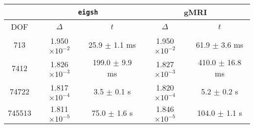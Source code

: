 \centering
\renewcommand{\arraystretch}{1.1}
\begin{tabular}{@{}c|cc|cc@{}}
    \toprule
     & \multicolumn{2}{c|}{\texttt{eigsh}} & \multicolumn{2}{c}{\acrshort{gMRI}} \\
    \midrule
    DOF & $\Delta$ & $t$ & $\Delta$ & $t$ \\
    \midrule
    713 & 1.950 $\times 10^{-2}$ & 25.9 $\pm$ 1.1 ms & 1.950 $\times 10^{-2}$ & 61.9 $\pm$ 3.6 ms \\
    7412 & 1.826 $\times 10^{-3}$ & 199.0 $\pm$ 9.9 ms & 1.827 $\times 10^{-3}$ & 410.0 $\pm$ 16.8 ms \\
    74722 & 1.817 $\times 10^{-4}$ & 3.5 $\pm$ 0.1 s & 1.820 $\times 10^{-4}$ & 5.2 $\pm$ 0.2 s \\
    745513 & 1.811 $\times 10^{-5}$ & 75.0 $\pm$ 1.6 s & 1.846 $\times 10^{-5}$ & 104.0 $\pm$ 1.1 s \\
    \bottomrule
\end{tabular}